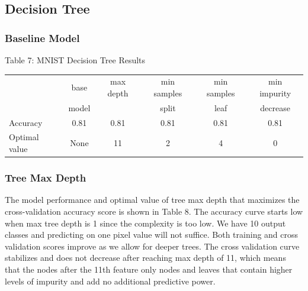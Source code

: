 \documentclass{article}
\begin{document}
\subsection{Decision Tree}
\subsubsection*{Baseline Model}
\begin{table}
	
	\centering
	Table 7: MNIST Decision Tree Results \\
	\begin{tabular}{ l c c c c c }
		\hline
		& base & max depth & min samples & min samples & min impurity\\
		& model & & split & leaf & decrease \\
		\hline
		Accuracy & 0.81 & 0.81 & 0.81 & 0.81 & 0.81 \\
		Optimal value & None & 11 & 2 & 4 & 0 \\
		
		
		\hline 
	\end{tabular}
\end{table}

\subsubsection*{Tree Max Depth}
The model performance and optimal value of tree max depth that maximizes the cross-validation accuracy score is shown in Table 8. The accuracy curve starts low when max tree depth is 1 since the complexity is too low. We have 10 output classes and predicting on one pixel value will not suffice. Both training and cross validation scores improve as we allow for deeper trees. The cross validation curve stabilizes and does not decrease after reaching max depth of 11, which means that the nodes after the 11th feature only nodes and leaves that contain higher levels of impurity and add no additional predictive power. 
\end{document}
